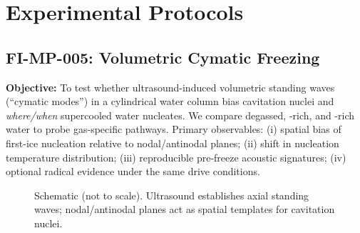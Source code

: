 \documentclass[12pt,oneside]{memoir}
\theoremstyle{plain}
\theoremstyle{definition}
\theoremstyle{remark}
\newcommand{\R}{\mathbb{R}}
\begin{document}
\chapter{Experimental Protocols}

\section{FI-MP-005: Volumetric Cymatic Freezing}

\textbf{Objective:} To test whether ultrasound-induced volumetric standing waves (``cymatic modes'') in a cylindrical water column bias cavitation nuclei and \emph{where/when} supercooled water nucleates. We compare degassed, -rich, and -rich water to probe gas-specific pathways. Primary observables: (i) spatial bias of first-ice nucleation relative to nodal/antinodal planes; (ii) shift in nucleation temperature distribution; (iii) reproducible pre-freeze acoustic signatures; (iv) optional radical evidence under the same drive conditions.

\begin{figure}[h]
  \centering
  \caption{Schematic (not to scale). Ultrasound establishes axial standing waves; nodal/antinodal planes act as spatial templates for cavitation nuclei.}
\end{figure}
\end{document}

